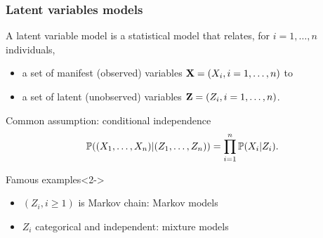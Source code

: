 \documentclass{beamer}\usepackage[]{graphicx}\usepackage[]{color}
\begin{document}
\begin{frame}
  \frametitle{Latent variables models}

  \begin{definition}
    A \alert{latent variable model} is a statistical model that relates, for $i=1,\dots,n$ individuals,
  \begin{itemize}
    \item a set of \alert{manifest} (observed) variables $\mathbf{X} = (X_i, i=1,\dots,n)$ to
    \item a set of \alert{latent} (unobserved) variables $\mathbf{Z} = (Z_i, i=1,\dots,n)$.
    \end{itemize}
  \end{definition}

  \begin{block}{Common assumption: conditional independence}
    \vspace{-.5cm}
    \begin{equation*}
      \mathbb{P}((X_1, \dots, X_n)|(Z_1,\dots, Z_n))  = \prod_{i=1}^n \mathbb{P}(X_i| Z_i).
    \end{equation*}
  \end{block}

  \vspace{-.25cm}

  \begin{block}{Famous examples}<2->
    \vspace{-.25cm}
    \begin{itemize}
      \item $(Z_i, i\geq 1)$ is Markov chain: \alert{Markov models}
      \item $Z_i$ categorical and independent: \alert{mixture models}
    \end{itemize}
  \end{block}

\end{frame}
\end{document}
